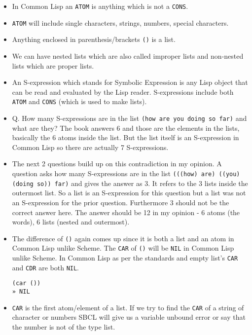 \documentclass[11pt]{article}
\begin{document}
\vspace{1em}

\begin{itemize}
\item In Common Lisp an \texttt{ATOM} is anything which is not a \texttt{CONS}.
\item \texttt{ATOM} will include single characters, strings, numbers, special characters.
\item Anything enclosed in parenthesis/brackets \texttt{()} is a list.
\item We can have nested lists which are also called improper lists and non-nested lists which are proper lists.
\item An S-expression which stands for Symbolic Expression is any Lisp object that can be read and evaluated by the
Lisp reader. S-expressions include both \texttt{ATOM} and \texttt{CONS} (which is used to make lists).
\item Q. How many S-expressions are in the list \texttt{(how are you doing so far)} and what are they? The book answers 6 and
those are the elements in the lists, basically the 6 atoms inside the list. But the list itself is an S-expression
in Common Lisp so there are actually 7 S-expressions.
\item The next 2 questions build up on this contradiction in my opinion. A question asks how many S-expressions are in the
list \texttt{(((how) are) ((you) (doing so)) far)} and gives the answer as 3. It refers to the 3 lists inside the outermost
list. So a list is an S-expression for this question but a list was not an S-expression for the prior question.
Furthermore 3 should not be the correct answer here. The answer should be 12 in my opinion - 6 atoms (the words),
6 lists (nested and outermost).
\item The difference of \texttt{()} again comes up since it is both a list and an atom in Common Lisp unlike Scheme. The \texttt{CAR}
of \texttt{()} will be \texttt{NIL} in Common Lisp unlike Scheme. In Common Lisp as per the standards and empty list's \texttt{CAR} and
\texttt{CDR} are both \texttt{NIL}.
\begin{verbatim}
(car ())
» NIL

\end{verbatim}
\item \texttt{CAR} is the first atom/element of a list. If we try to find the \texttt{CAR} of a string of character or numbers SBCL will
give us a variable unbound error or say that the number is not of the type list.
\end{itemize}
\end{document}
